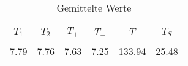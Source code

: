 \begin{table} 
 \centering 
 \begin{tabular}{S S S S S S } 
 \toprule \\ 
$T_{1}$  & $T_{2}$  & $T_{+}$  & $T_{-}$  & $T$  & $T_{S}$ \\ 
\midrule \\ 
 7.79   & 7.76   & 7.63   & 7.25   & 133.94   & 25.48 \\ 
 \bottomrule 
 \end{tabular} 
 \caption{Gemittelte Werte} 
 \label{tab:mids_T} 
  \end{table}